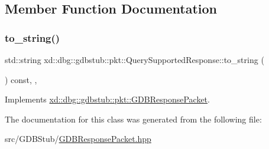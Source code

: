 \subsection{Member Function Documentation}
\mbox{\label{classxd_1_1dbg_1_1gdbstub_1_1pkt_1_1_query_supported_response_a31faab3ddafc47625129ae445fbc1b1e}} 
\subsubsection{\texorpdfstring{to\+\_\+string()}{to\_string()}}
{\footnotesize\ttfamily std\+::string xd\+::dbg\+::gdbstub\+::pkt\+::\+Query\+Supported\+Response\+::to\+\_\+string (\begin{DoxyParamCaption}{ }\end{DoxyParamCaption}) const\hspace{0.3cm}{\ttfamily [inline]}, {\ttfamily [override]}, {\ttfamily [virtual]}}



Implements \mbox{\hyperlink{classxd_1_1dbg_1_1gdbstub_1_1pkt_1_1_g_d_b_response_packet_a2a15795536cd5ff94f0533c406233874}{xd\+::dbg\+::gdbstub\+::pkt\+::\+G\+D\+B\+Response\+Packet}}.



The documentation for this class was generated from the following file\+:\begin{DoxyCompactItemize}
\item 
src/\+G\+D\+B\+Stub/\mbox{\hyperlink{_g_d_b_response_packet_8hpp}{G\+D\+B\+Response\+Packet.\+hpp}}\end{DoxyCompactItemize}
